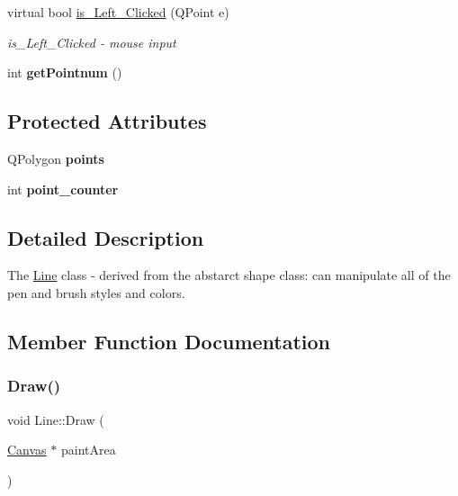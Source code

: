 \begin{DoxyCompactItemize}
virtual bool \hyperlink{class_line_a79c3891fefd740e6a3cfcdb57a105995}{is\+\_\+\+Left\+\_\+\+Clicked} (Q\+Point e)
\begin{DoxyCompactList}\small\item\em is\+\_\+\+Left\+\_\+\+Clicked -\/ mouse input \end{DoxyCompactList}\item 
\mbox{\label{class_line_ad0e0cc191a40c9203e6e8f753d837f01}} 
int {\bfseries get\+Pointnum} ()
\end{DoxyCompactItemize}
\subsection*{Protected Attributes}
\begin{DoxyCompactItemize}
\item 
\mbox{\label{class_line_acb42aa5b881c81224994fdcd80227e73}} 
Q\+Polygon {\bfseries points}
\item 
\mbox{\label{class_line_a0954f1ba173e19a23eb88b3c56d59c04}} 
int {\bfseries point\+\_\+counter}
\end{DoxyCompactItemize}


\subsection{Detailed Description}
The \hyperlink{class_line}{Line} class -\/ derived from the abstarct shape class\+: can manipulate all of the pen and brush styles and colors. 

\subsection{Member Function Documentation}
\mbox{\label{class_line_ae645f8a7f03439fa3428f81b1ddb4ffc}} 
\subsubsection{\texorpdfstring{Draw()}{Draw()}}
{\footnotesize\ttfamily void Line\+::\+Draw (\begin{DoxyParamCaption}\item[{\hyperlink{class_canvas}{Canvas} $\ast$}]{paint\+Area }\end{DoxyParamCaption})\hspace{0.3cm}{\ttfamily [virtual]}}



